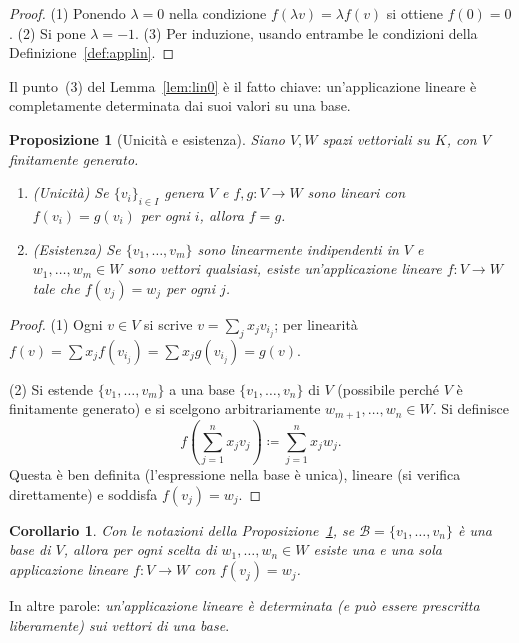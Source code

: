 \documentclass[11pt, a4paper]{book}
\theoremstyle{definition}
\theoremstyle{plain}
\newtheorem{proposizione}[definizione]{Proposizione}
\newtheorem{corollario}[definizione]{Corollario}
\theoremstyle{remark}
\begin{document}
\begin{proof}
(1) Ponendo $\lambda = 0$ nella condizione $f(\lambda v) = \lambda f(v)$ si ottiene $f(0) = 0$. (2) Si pone $\lambda = -1$. (3) Per induzione, usando entrambe le condizioni della Definizione~\ref{def:applin}.
\end{proof}

Il punto~(3) del Lemma~\ref{lem:lin0} è il fatto chiave: un'applicazione lineare è completamente determinata dai suoi valori su una base.

\begin{proposizione}[Unicità e esistenza]
\label{prop:uniq-lin}
Siano $V, W$ spazi vettoriali su $K$, con $V$ finitamente generato.
\begin{enumerate}
  \item \emph{(Unicità)} Se $\{v_i\}_{i \in I}$ genera $V$ e $f, g \colon V \to W$ sono lineari con $f(v_i) = g(v_i)$ per ogni $i$, allora $f = g$.
  \item \emph{(Esistenza)} Se $\{v_1, \ldots, v_m\}$ sono linearmente indipendenti in $V$ e $w_1, \ldots, w_m \in W$ sono vettori qualsiasi, esiste un'applicazione lineare $f \colon V \to W$ tale che $f(v_j) = w_j$ per ogni $j$.
\end{enumerate}
\end{proposizione}

\begin{proof}
(1) Ogni $v \in V$ si scrive $v = \sum_j x_j v_{i_j}$; per linearità $f(v) = \sum x_j f(v_{i_j}) = \sum x_j g(v_{i_j}) = g(v)$.

(2) Si estende $\{v_1, \ldots, v_m\}$ a una base $\{v_1, \ldots, v_n\}$ di $V$ (possibile perché $V$ è finitamente generato) e si scelgono arbitrariamente $w_{m+1}, \ldots, w_n \in W$. Si definisce
\[
  f\!\left(\sum_{j=1}^n x_j v_j\right) \coloneqq \sum_{j=1}^n x_j w_j.
\]
Questa è ben definita (l'espressione nella base è unica), lineare (si verifica direttamente) e soddisfa $f(v_j) = w_j$.
\end{proof}

\begin{corollario}
\label{cor:lin-base}
Con le notazioni della Proposizione~\ref{prop:uniq-lin}, se $\mathcal{B} = \{v_1, \ldots, v_n\}$ è una base di $V$, allora per ogni scelta di $w_1, \ldots, w_n \in W$ esiste una e una sola applicazione lineare $f \colon V \to W$ con $f(v_j) = w_j$.
\end{corollario}

In altre parole: \emph{un'applicazione lineare è determinata (e può essere prescritta liberamente) sui vettori di una base}.
\end{document}
